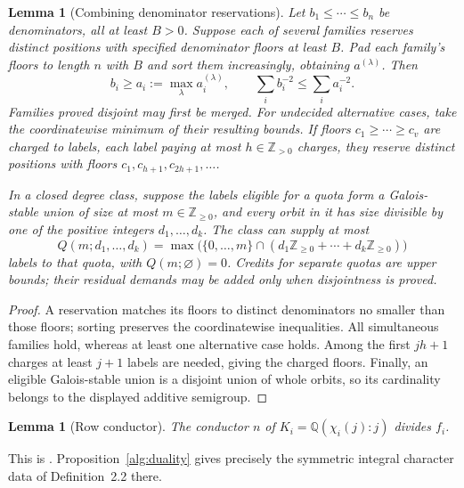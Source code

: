 \documentclass[11pt]{amsart}
\numberwithin{equation}{section}
\newtheorem{lemma}[theorem]{Lemma}
\theoremstyle{definition}
\theoremstyle{plain}
\newcommand{\QQ}{\mathbb Q}
\begin{document}
\begin{lemma}[Combining denominator reservations]\label{new:reservation-calculus}
Let $b_1\le\cdots\le b_n$ be denominators, all at least $B>0$.
Suppose each of several families reserves distinct positions with
specified denominator floors at least $B$. Pad each family's floors to length $n$
with $B$ and sort them increasingly, obtaining $a^{(\lambda)}$.
Then
\[
 b_i\ge a_i:=\max_\lambda a_i^{(\lambda)},\qquad
 \sum_i b_i^{-2}\le\sum_i a_i^{-2}.
\]
Families proved disjoint may first be merged. For undecided alternative
cases, take the coordinatewise minimum of their resulting bounds.
If floors $c_1\ge\cdots\ge c_v$ are charged to labels, each label
paying at most $h\in\mathbb Z_{>0}$ charges, they reserve distinct positions with floors
$c_1,c_{h+1},c_{2h+1},\ldots$.

In a closed degree class, suppose the labels eligible for a quota
form a Galois-stable union of size at most $m\in\mathbb Z_{\ge0}$,
and every orbit in it has size divisible by one of the positive
integers $d_1,\ldots,d_k$. The class can supply at most
\[
 Q(m;d_1,\ldots,d_k)
 =\max\bigl(\{0,\ldots,m\}\cap
               (d_1\mathbb Z_{\ge0}+\cdots+d_k\mathbb Z_{\ge0})\bigr)
\]
labels to that quota, with $Q(m;\varnothing)=0$.
Credits for separate quotas are upper bounds;
their residual demands may be added only when disjointness is proved.
\end{lemma}
\begin{proof}
A reservation matches its floors to distinct denominators no smaller
than those floors; sorting preserves the coordinatewise inequalities.
All simultaneous families hold, whereas at least one alternative case
holds. Among the first $jh+1$ charges at least $j+1$ labels are needed,
giving the charged floors. Finally, an eligible Galois-stable union is
a disjoint union of whole orbits, so its cardinality belongs to the
displayed additive semigroup.
\end{proof}

\begin{lemma}[Row conductor]\label{conduct}
The conductor $n$ of $K_i=\QQ(\chi_i(j):j)$ divides $f_i$.
\end{lemma}
This is \cite[Theorem~2.9]{BDPcore}. Proposition~\ref{alg:duality} gives precisely the symmetric integral character data of Definition~2.2 there.
\end{document}
